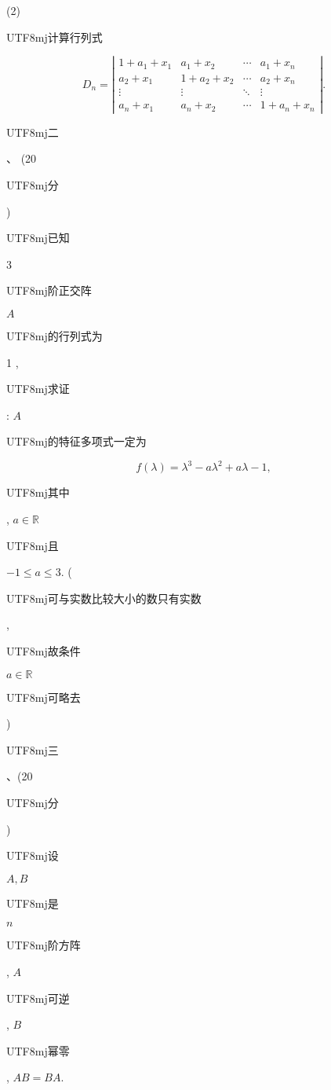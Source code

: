 \documentclass[10pt]{article}
\begin{document}
(2) \begin{CJK}{UTF8}{mj}计算行列式\end{CJK}
$$
D_{n}=\left|\begin{array}{cccc}
1+a_{1}+x_{1} & a_{1}+x_{2} & \cdots & a_{1}+x_{n} \\
a_{2}+x_{1} & 1+a_{2}+x_{2} & \cdots & a_{2}+x_{n} \\
\vdots & \vdots & \ddots & \vdots \\
a_{n}+x_{1} & a_{n}+x_{2} & \cdots & 1+a_{n}+x_{n}
\end{array}\right| .
$$
\begin{CJK}{UTF8}{mj}二\end{CJK}、 (20 \begin{CJK}{UTF8}{mj}分\end{CJK}) \begin{CJK}{UTF8}{mj}已知\end{CJK} 3 \begin{CJK}{UTF8}{mj}阶正交阵\end{CJK} $A$ \begin{CJK}{UTF8}{mj}的行列式为\end{CJK} 1 , \begin{CJK}{UTF8}{mj}求证\end{CJK}: $A$ \begin{CJK}{UTF8}{mj}的特征多项式一定为\end{CJK}
$$
f(\lambda)=\lambda^{3}-a \lambda^{2}+a \lambda-1,
$$
\begin{CJK}{UTF8}{mj}其中\end{CJK}, $a \in \mathbb{R}$ \begin{CJK}{UTF8}{mj}且\end{CJK} $-1 \leq a \leq 3$. (\begin{CJK}{UTF8}{mj}可与实数比较大小的数只有实数\end{CJK}, \begin{CJK}{UTF8}{mj}故条件\end{CJK} $a \in \mathbb{R}$ \begin{CJK}{UTF8}{mj}可略去\end{CJK})

\begin{CJK}{UTF8}{mj}三\end{CJK}、(20 \begin{CJK}{UTF8}{mj}分\end{CJK}) \begin{CJK}{UTF8}{mj}设\end{CJK} $A, B$ \begin{CJK}{UTF8}{mj}是\end{CJK} $n$ \begin{CJK}{UTF8}{mj}阶方阵\end{CJK}, $A$ \begin{CJK}{UTF8}{mj}可逆\end{CJK}, $B$ \begin{CJK}{UTF8}{mj}幂零\end{CJK}, $A B=B A$.
\end{document}
